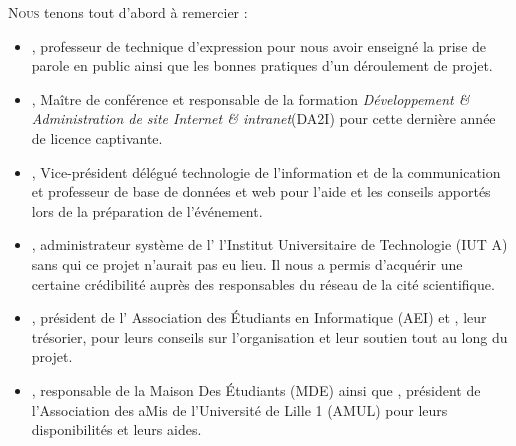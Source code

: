 \lettrine{N}{ous} tenons tout d'abord à remercier :

\begin{itemize}

\item {}, professeur de technique d'expression pour nous
avoir enseigné la prise de parole en public ainsi que les bonnes
pratiques d'un déroulement de projet.

\item {}, Maître de conférence et responsable de la
formation \emph{Développement \& Administration de site Internet \&
intranet}(DA2I) pour cette dernière année de licence captivante.

\item {}, Vice-président délégué technologie de
l'information et de la communication et professeur de base de données et
web pour l'aide et les conseils apportés lors de la préparation de
l'événement.

\item {}, administrateur système de l' \og l'Institut
Universitaire de Technologie \fg{} (IUT A) sans qui ce projet n'aurait pas
eu lieu. Il nous a permis d'acquérir une certaine crédibilité auprès des
responsables du réseau de la cité scientifique.

\item {}, président de l' \og Association des Étudiants en
Informatique \fg{} (AEI) et , leur trésorier, pour
leurs conseils sur l'organisation et leur soutien tout au long du
projet.

\item {}, responsable de la \og Maison Des Étudiants \fg{}
(MDE) ainsi que , président de l'\og Association des aMis
de l'Université de Lille 1 \fg{} (AMUL) pour leurs disponibilités et
leurs aides.

\end{itemize}
